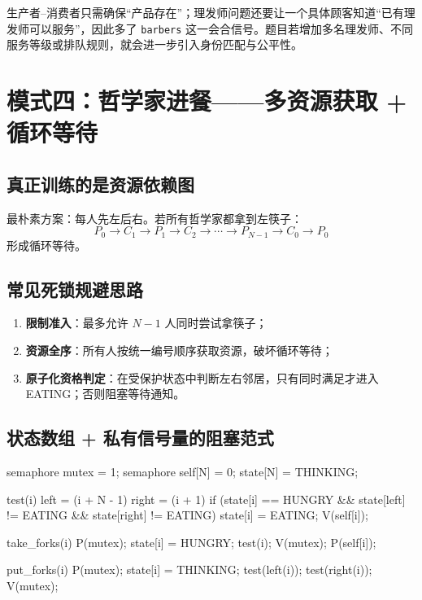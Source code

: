 \documentclass[11pt,a4paper]{ctexart}
\newcommand{\kw}[1]{\textbf{#1}}
\newcommand{\code}[1]{\texttt{#1}}
\begin{document}
生产者--消费者只需确保“产品存在”；理发师问题还要让一个具体顾客知道“已有理发师可以服务”，因此多了 \code{barbers} 这一会合信号。题目若增加多名理发师、不同服务等级或排队规则，就会进一步引入身份匹配与公平性。

\section{模式四：哲学家进餐——多资源获取 + 循环等待}

\subsection{真正训练的是资源依赖图}

最朴素方案：每人先左后右。若所有哲学家都拿到左筷子：
\[
P_0\to C_1\to P_1\to C_2\to\cdots\to P_{N-1}\to C_0\to P_0
\]
形成循环等待。

\subsection{常见死锁规避思路}

\begin{enumerate}
\item \kw{限制准入}：最多允许 $N-1$ 人同时尝试拿筷子；
\item \kw{资源全序}：所有人按统一编号顺序获取资源，破坏循环等待；
\item \kw{原子化资格判定}：在受保护状态中判断左右邻居，只有同时满足才进入 EATING；否则阻塞等待通知。
\end{enumerate}

\subsection{状态数组 + 私有信号量的阻塞范式}

\begin{codeblock}
semaphore mutex = 1;
semaphore self[N] = {0};
state[N] = {THINKING};

test(i) {
    left  = (i + N - 1) %
    right = (i + 1) %
    if (state[i] == HUNGRY &&
        state[left]  != EATING &&
        state[right] != EATING) {
        state[i] = EATING;
        V(self[i]);
    }
}

take_forks(i) {
    P(mutex);
    state[i] = HUNGRY;
    test(i);
    V(mutex);
    P(self[i]);
}

put_forks(i) {
    P(mutex);
    state[i] = THINKING;
    test(left(i));
    test(right(i));
    V(mutex);
}
\end{codeblock}
\end{document}
